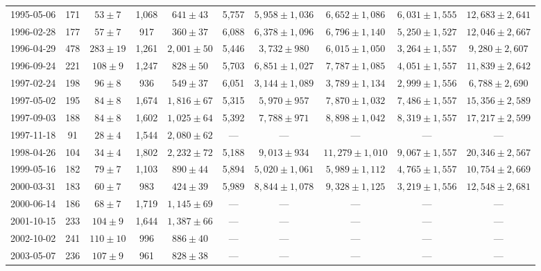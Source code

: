 \begin{landscape}
\begin{longtable}{cccccccccc}
{1995-05-06} & 171 & {$53  \pm  7$} & 1,068 & {$641 \pm 43$} & 5,757 & {$5,958 \pm 1,036$} & {$6,652 \pm 1,086$} & {$6,031 \pm 1,555$} & {$12,683 \pm 2,641$} \\
{1996-02-28} & 177 & {$57  \pm  7$} & 917 & {$360 \pm 37$} & 6,088 & {$6,378 \pm 1,096$} & {$6,796 \pm 1,140$} & {$5,250 \pm 1,527$} & {$12,046 \pm 2,667$} \\
{1996-04-29} & 478 & {$283  \pm  19$} & 1,261 & {$2,001 \pm 50$} & 5,446 & {$3,732 \pm 980$} & {$6,015 \pm 1,050$} & {$3,264 \pm 1,557$} & {$9,280 \pm 2,607$} \\
{1996-09-24} & 221 & {$108  \pm  9$} & 1,247 & {$828 \pm 50$} & 5,703 & {$6,851 \pm 1,027$} & {$7,787 \pm 1,085$} & {$4,051 \pm 1,557$} & {$11,839 \pm 2,642$} \\
{1997-02-24} & 198 & {$96  \pm  8$} & 936 & {$549 \pm 37$} & 6,051 & {$3,144 \pm 1,089$} & {$3,789 \pm 1,134$} & {$2,999 \pm 1,556$} & {$6,788 \pm 2,690$} \\
{1997-05-02} & 195 & {$84  \pm  8$} & 1,674 & {$1,816 \pm 67$} & 5,315 & {$5,970 \pm 957$} & {$7,870 \pm 1,032$} & {$7,486 \pm 1,557$} & {$15,356 \pm 2,589$} \\
{1997-09-03} & 188 & {$84  \pm  8$} & 1,602 & {$1,025 \pm 64$} & 5,392 & {$7,788 \pm 971$} & {$8,898 \pm 1,042$} & {$8,319 \pm 1,557$} & {$17,217 \pm 2,599$} \\
{1997-11-18} & 91 & {$28  \pm  4$} & 1,544 & {$2,080 \pm 62$} & --- & --- & --- & --- & --- \\
{1998-04-26} & 104 & {$34  \pm  4$} & 1,802 & {$2,232 \pm 72$} & 5,188 & {$9,013 \pm 934$} & {$11,279 \pm 1,010$} & {$9,067 \pm 1,557$} & {$20,346 \pm 2,567$} \\
{1999-05-16} & 182 & {$79  \pm  7$} & 1,103 & {$890 \pm 44$} & 5,894 & {$5,020 \pm 1,061$} & {$5,989 \pm 1,112$} & {$4,765 \pm 1,557$} & {$10,754 \pm 2,669$} \\
{2000-03-31} & 183 & {$60  \pm  7$} & 983 & {$424 \pm 39$} & 5,989 & {$8,844 \pm 1,078$} & {$9,328 \pm 1,125$} & {$3,219 \pm 1,556$} & {$12,548 \pm 2,681$} \\
{2000-06-14} & 186 & {$68  \pm  7$} & 1,719 & {$1,145 \pm 69$} & --- & --- & --- & --- & --- \\
{2001-10-15} & 233 & {$104  \pm  9$} & 1,644 & {$1,387 \pm 66$} & --- & --- & --- & --- & --- \\
{2002-10-02} & 241 & {$110  \pm  10$} & 996 & {$886 \pm 40$} & --- & --- & --- & --- & --- \\
{2003-05-07} & 236 & {$107  \pm  9$} & 961 & {$828 \pm 38$} & --- & --- & --- & --- & --- \\

\end{longtable}
\end{landscape}
